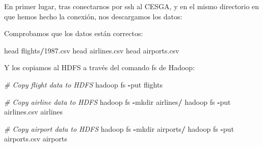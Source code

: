 \documentclass[]{book}
\newenvironment{Shaded}{\begin{snugshade}}{\end{snugshade}}
\newcommand{\DecValTok}[1]{\textcolor[rgb]{0.00,0.00,0.81}{#1}}
\newcommand{\FloatTok}[1]{\textcolor[rgb]{0.00,0.00,0.81}{#1}}
\newcommand{\StringTok}[1]{\textcolor[rgb]{0.31,0.60,0.02}{#1}}
\newcommand{\CommentTok}[1]{\textcolor[rgb]{0.56,0.35,0.01}{\textit{#1}}}
\newcommand{\ControlFlowTok}[1]{\textcolor[rgb]{0.13,0.29,0.53}{\textbf{#1}}}
\newcommand{\OperatorTok}[1]{\textcolor[rgb]{0.81,0.36,0.00}{\textbf{#1}}}
\newcommand{\ErrorTok}[1]{\textcolor[rgb]{0.64,0.00,0.00}{\textbf{#1}}}
\newcommand{\NormalTok}[1]{#1}
\begin{document}
En primer lugar, tras conectarnos por ssh al CESGA, y en el mismo
directorio en que hemos hecho la conexión, nos descargamos los datos:

\begin{Shaded}
\end{Shaded}

Comprobamos que los datos están correctos:

\begin{Shaded}
\begin{Highlighting}[]
\NormalTok{head flights}\OperatorTok{/}\FloatTok{1987.}\NormalTok{csv }
\NormalTok{head airlines.csv}
\NormalTok{head airports.csv}
\end{Highlighting}
\end{Shaded}

Y los copiamos al HDFS a través del comando fs de Hadoop:

\begin{Shaded}
\begin{Highlighting}[]
\CommentTok{# Copy flight data to HDFS}
\NormalTok{hadoop fs }\OperatorTok{-}\NormalTok{put flights }

\CommentTok{# Copy airline data to HDFS}
\NormalTok{hadoop fs }\OperatorTok{-}\NormalTok{mkdir airlines}\OperatorTok{/}
\NormalTok{hadoop fs }\OperatorTok{-}\NormalTok{put airlines.csv airlines}

\CommentTok{# Copy airport data to HDFS}
\NormalTok{hadoop fs }\OperatorTok{-}\NormalTok{mkdir airports}\OperatorTok{/}
\NormalTok{hadoop fs }\OperatorTok{-}\NormalTok{put airports.csv airports}
\end{Highlighting}
\end{Shaded}
\end{document}

